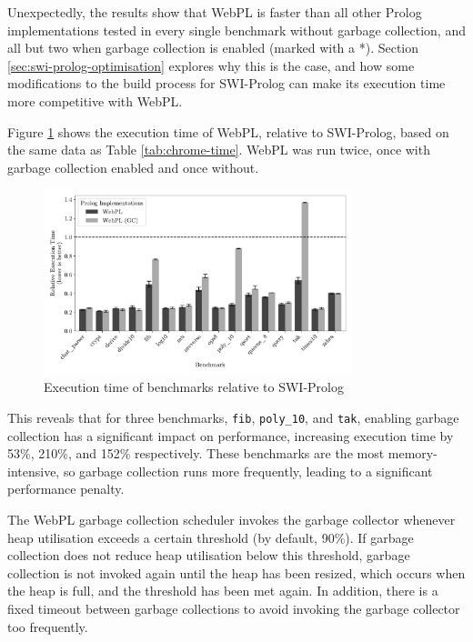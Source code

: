 Unexpectedly, the results show that WebPL is faster than all other Prolog implementations tested in every single benchmark without garbage collection, and all but two when garbage collection is enabled (marked with a *). Section \ref{sec:swi-prolog-optimisation} explores why this is the case, and how some modifications to the build process for SWI-Prolog can make its execution time more competitive with WebPL.

Figure \ref{fig:relative-performance} shows the execution time of WebPL, relative to SWI-Prolog, based on the same data as Table \ref{tab:chrome-time}. WebPL was run twice, once with garbage collection enabled and once without.

\begin{figure}[H]
\centering
\includegraphics[width=0.8\textwidth]{relative_performance.pdf}
\caption{Execution time of benchmarks relative to SWI-Prolog}
\label{fig:relative-performance}
\end{figure}

This reveals that for three benchmarks, \texttt{fib}, \texttt{poly\_10}, and \texttt{tak}, enabling garbage collection has a significant impact on performance, increasing execution time by 53\%, 210\%, and 152\% respectively. These benchmarks are the most memory-intensive, so garbage collection runs more frequently, leading to a significant performance penalty.

The WebPL garbage collection scheduler invokes the garbage collector whenever heap utilisation exceeds a certain threshold (by default, 90\%). If garbage collection does not reduce heap utilisation below this threshold, garbage collection is not invoked again until the heap has been resized, which occurs when the heap is full, and the threshold has been met again. In addition, there is a fixed timeout between garbage collections to avoid invoking the garbage collector too frequently.

